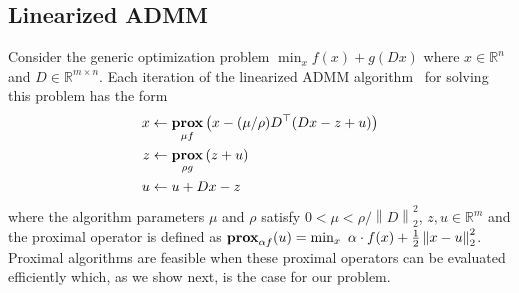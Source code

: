 \documentclass{article}
\newcommand{\norm}[1]{\left\lVert #1 \right\rVert}
\DeclareMathOperator*{\prox}{\bf prox}
\begin{document}
\subsection{Linearized ADMM}
\label{sec:linADMM}


Consider the generic optimization problem
$\min_x f(x)+g(Dx)$
where $x\in \mathbb{R}^n$ and $D\in \mathbb{R}^{m\times n}$. Each
iteration of the linearized ADMM
algorithm~\citep{parikh_proximal_2014} for solving this problem 
has the form
\begin{align}
x & \leftarrow \prox_{\mu f} \left(x - (\mu/\rho)D^\top (D x - z + u )\right)\\
z & \leftarrow \prox_{\rho g} \left(z + u\right) \label{eq:linADMM_steps}\\
u & \leftarrow u + D x - z
\end{align}
where the algorithm parameters $\mu$ and $\rho$ satisfy $0 < \mu < \rho/\norm{D}_2^2$, $z,u\in \mathbb{R}^m$ and the proximal operator is defined as $\prox_{\alpha f}(u) = \min_x \,\, \alpha \cdot f(x)+\frac{1}{2} \norm{ x-u}_2^2$. Proximal algorithms are feasible when these proximal operators can be evaluated efficiently which, as we show next, is the case for our problem. 

 
\end{document}
